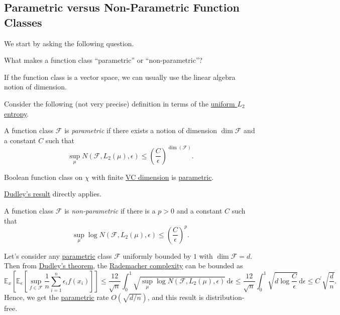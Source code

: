 \subsection{Parametric versus Non-Parametric Function Classes}
We start by asking the following question.

\begin{problem*}
	What makes a function class ``parametric'' or ``non-parametric''?
\end{problem*}
\begin{answer}
	If the function class is a vector space, we can usually use the linear algebra notion of dimension.
\end{answer}

Consider the following (not very precise) definition in terms of the \hyperref[def:Koltchinskii-Pollard-entropy]{uniform \(L_2\) entropy}.

\begin{definition}[Parametric]\label{def:parametric}
	A function class \(\mathscr{F} \) is \emph{parametric} if there exists a notion of dimension \(\dim \mathscr{F} \) and a constant \(C\) such that
	\[
		\sup _\mu N(\mathscr{F} , L_2(\mu ), \epsilon ) \leq \left( \frac{C}{\epsilon } \right) ^{\dim(\mathscr{F} )}.
	\]
\end{definition}

\begin{eg}
	Boolean function class on \(\chi \) with finite \hyperref[def:VC-dimension]{VC dimension} is \hyperref[def:parametric]{parametric}.
\end{eg}
\begin{explanation}
	\hyperref[thm:Dudley]{Dudley's result} directly applies.
\end{explanation}

\begin{definition}\label{def:non-parametric}
	A function class \(\mathscr{F} \) is \emph{non-parametric} if there is a \(p > 0\) and a constant \(C\) such that
	\[
		\sup _\mu \log N(\mathscr{F} , L_2(\mu ), \epsilon ) \leq \left( \frac{C}{\epsilon } \right) ^p.
	\]
\end{definition}

Let's consider any \hyperref[def:parametric]{parametric} class \(\mathscr{F} \) uniformly bounded by \(1\) with \(\dim \mathscr{F} = d\). Then from \hyperref[thm:Dudley]{Dudley's theorem}, the \hyperref[def:Rademacher-complexity]{Rademacher complexity} can be bounded as
\[
	\mathbb{E}_{x}\left[\mathbb{E}_{\epsilon }\left[\sup _{f\in \mathscr{F} } \frac{1}{n}\sum_{i=1}^{n} \epsilon _i f(x_i) \right]  \right]
	\leq \frac{12}{\sqrt{n} } \int_{0}^{1} \sqrt{\sup _\mu \log N(\mathscr{F} , L_2(\mu ), \epsilon )} \,\mathrm{d}\epsilon
	\leq \frac{12}{\sqrt{n} } \int_{0}^{1} \sqrt{d \log \frac{C}{\epsilon }} \,\mathrm{d}\epsilon
	\leq C^{\prime} \sqrt{\frac{d}{n}}.
\]
Hence, we get the \hyperref[def:parametric]{parametric} rate \(O(\sqrt{d / n} )\), and this result is distribution-free.


